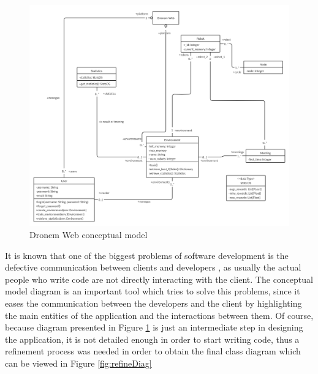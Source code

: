 \begin{figure}[!htb]
    \centering
    \includegraphics[scale=0.19]{Figures/conceptualModel.jpg}
    \caption{Dronem Web conceptual model}
    \label{fig:conceptualModel}
\end{figure}{}

It is known that one of the biggest problems of software development is the defective communication between clients and developers \cite{communicationProblems}, as usually the actual people who write code are not directly interacting with the client. The conceptual model diagram is an important tool which tries to solve this problems, since it eases the communication between the developers and the client by highlighting the main entities of the application and the interactions between them.
Of course, because diagram presented in Figure \ref{fig:conceptualModel} is just an intermediate step in designing the application, it is not detailed enough in order to start writing code, thus a refinement process was needed in order to obtain the final class diagram which can be viewed in Figure \ref{fig:refineDiag}

